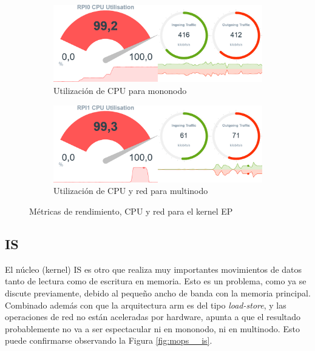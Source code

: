 \begin{figure}[h!]
    \begin{subfigure}[c]{0.9\textwidth}
        \includegraphics[width=\textwidth]{img/benchmark_rev/ep_rev_sn.png}
        \caption{Utilización de CPU para mononodo}
        \label{fig:mops_rev_sn__ep}
    \end{subfigure}

    \vspace{0.5cm}
    
    \begin{subfigure}[c]{0.9\textwidth}
        \includegraphics[width=\textwidth]{img/benchmark_rev/ep_rev_mn.png}
        \caption{Utilización de CPU y red para multinodo}
        \label{fig:mops_rev_mn__ep}
    \end{subfigure}
    \caption{Métricas de rendimiento, CPU y red para el kernel EP}
    \label{fig:mops__ep}
\end{figure}

\subsection{IS}
\label{ssec:comparacion_resultados__is}
El núcleo (kernel) IS es otro que realiza muy importantes movimientos de datos tanto de lectura como de escritura en memoria. Esto es un problema, como ya se discute previamente, debido al pequeño ancho de banda con la memoria principal. Combinado además con que la arquitectura \acrshort{arm} es del tipo \textit{load-store}, y las operaciones de red no están aceleradas por hardware, apunta a que el resultado probablemente no va a ser espectacular ni en mononodo, ni en multinodo. Esto puede confirmarse observando la Figura \ref{fig:mops__is}.

